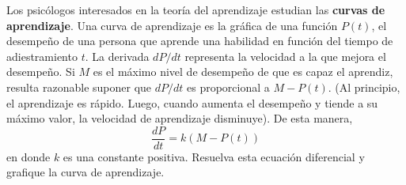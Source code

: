 \item Los psicólogos interesados en la teoría del aprendizaje estudian las \textbf{curvas de aprendizaje}. Una curva de aprendizaje es la gráfica de una función $P(t)$, el desempeño de una persona que aprende una habilidad en función del tiempo de adiestramiento $t$. La derivada $dP/dt$ representa la velocidad a la que mejora el desempeño. Si $M$ es el máximo nivel de desempeño de que es capaz el aprendiz, resulta razonable suponer que $dP/dt$ es proporcional a $M - P(t)$. (Al principio, el aprendizaje es rápido. Luego, cuando aumenta el desempeño y tiende a su máximo valor, la velocidad de aprendizaje disminuye). De esta manera,
    \[ \frac{dP}{dt} = k(M - P(t)) \]
    en donde $k$ es una constante positiva. Resuelva esta ecuación diferencial y grafique la curva de aprendizaje.
